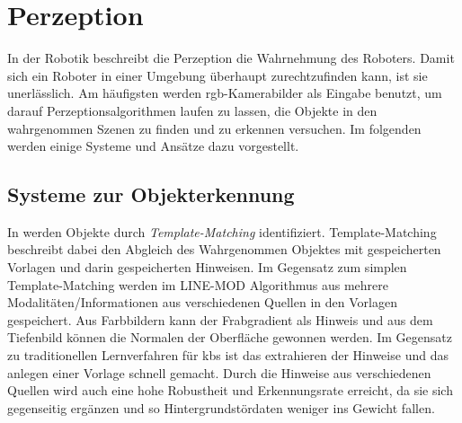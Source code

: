\section{Perzeption}
In der Robotik beschreibt die Perzeption die Wahrnehmung des Roboters. Damit sich ein Roboter in einer Umgebung überhaupt zurechtzufinden kann, ist sie unerlässlich. Am häufigsten werden \gls{rgb}-Kamerabilder als Eingabe benutzt, um darauf Perzeptionsalgorithmen laufen zu lassen, die Objekte in den wahrgenommen Szenen zu finden und zu erkennen versuchen. Im folgenden werden einige Systeme und Ansätze dazu vorgestellt.

\subsection{Systeme zur Objekterkennung}

In \cite{multimodalTemplate} werden Objekte durch \textit{Template-Matching} identifiziert. Template-Matching beschreibt dabei den Abgleich des Wahrgenommen Objektes mit gespeicherten Vorlagen und darin gespeicherten Hinweisen. Im Gegensatz zum simplen Template-Matching werden im LINE-MOD Algorithmus aus \cite{multimodalTemplate} mehrere Modalitäten/Informationen aus verschiedenen Quellen in den Vorlagen gespeichert. Aus Farbbildern kann der Frabgradient als Hinweis und aus dem Tiefenbild können die Normalen der Oberfläche gewonnen werden. Im Gegensatz zu traditionellen Lernverfahren für \glspl{kb} ist das extrahieren der Hinweise und das anlegen einer Vorlage schnell gemacht. Durch die Hinweise aus verschiedenen Quellen wird auch eine hohe Robustheit und Erkennungsrate erreicht, da sie sich gegenseitig ergänzen und so Hintergrundstördaten weniger ins Gewicht fallen. \par



